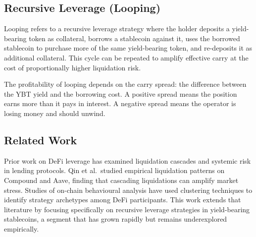 \subsection{Recursive Leverage (Looping)}

Looping refers to a recursive leverage strategy where the holder deposits a yield-bearing token as collateral, borrows a stablecoin against it, uses the borrowed stablecoin to purchase more of the same yield-bearing token, and re-deposits it as additional collateral. This cycle can be repeated to amplify effective carry at the cost of proportionally higher liquidation risk.

The profitability of looping depends on the carry spread: the difference between the YBT yield and the borrowing cost. A positive spread means the position earns more than it pays in interest. A negative spread means the operator is losing money and should unwind.

\subsection{Related Work}

Prior work on DeFi leverage has examined liquidation cascades and systemic risk in lending protocols. Qin et al.\ studied empirical liquidation patterns on Compound and Aave, finding that cascading liquidations can amplify market stress. Studies of on-chain behavioural analysis have used clustering techniques to identify strategy archetypes among DeFi participants. This work extends that literature by focusing specifically on recursive leverage strategies in yield-bearing stablecoins, a segment that has grown rapidly but remains underexplored empirically.
